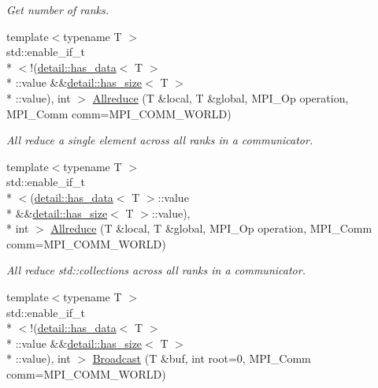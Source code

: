 \begin{DoxyCompactItemize}
\begin{DoxyCompactList}\small\item\em Get number of ranks. \end{DoxyCompactList}\item 
{\footnotesize template$<$typename T $>$ }\\std\-::enable\-\_\-if\-\_\-t\\*
$<$!(\hyperlink{structop_1_1mpi_1_1detail_1_1has__data}{detail\-::has\-\_\-data}$<$ T $>$\\*
\-::value \&\&\hyperlink{structop_1_1mpi_1_1detail_1_1has__size}{detail\-::has\-\_\-size}$<$ T $>$\\*
\-::value), int $>$ \hyperlink{namespaceop_1_1mpi_a9cc9ee45e5d727514fae9530152c6c8e}{Allreduce} (T \&local, T \&global, M\-P\-I\-\_\-\-Op operation, M\-P\-I\-\_\-\-Comm comm=M\-P\-I\-\_\-\-C\-O\-M\-M\-\_\-\-W\-O\-R\-L\-D)
\begin{DoxyCompactList}\small\item\em All reduce a single element across all ranks in a communicator. \end{DoxyCompactList}\item 
{\footnotesize template$<$typename T $>$ }\\std\-::enable\-\_\-if\-\_\-t\\*
$<$(\hyperlink{structop_1_1mpi_1_1detail_1_1has__data}{detail\-::has\-\_\-data}$<$ T $>$\-::value \\*
\&\&\hyperlink{structop_1_1mpi_1_1detail_1_1has__size}{detail\-::has\-\_\-size}$<$ T $>$\-::value), \\*
int $>$ \hyperlink{namespaceop_1_1mpi_abc01d3594b3261e69e34354914936c40}{Allreduce} (T \&local, T \&global, M\-P\-I\-\_\-\-Op operation, M\-P\-I\-\_\-\-Comm comm=M\-P\-I\-\_\-\-C\-O\-M\-M\-\_\-\-W\-O\-R\-L\-D)
\begin{DoxyCompactList}\small\item\em All reduce std\-::collections across all ranks in a communicator. \end{DoxyCompactList}\item 
{\footnotesize template$<$typename T $>$ }\\std\-::enable\-\_\-if\-\_\-t\\*
$<$!(\hyperlink{structop_1_1mpi_1_1detail_1_1has__data}{detail\-::has\-\_\-data}$<$ T $>$\\*
\-::value \&\&\hyperlink{structop_1_1mpi_1_1detail_1_1has__size}{detail\-::has\-\_\-size}$<$ T $>$\\*
\-::value), int $>$ \hyperlink{namespaceop_1_1mpi_a07d9e0338f9e1ad69f00873f453d23ac}{Broadcast} (T \&buf, int root=0, M\-P\-I\-\_\-\-Comm comm=M\-P\-I\-\_\-\-C\-O\-M\-M\-\_\-\-W\-O\-R\-L\-D)

\end{DoxyCompactItemize}
